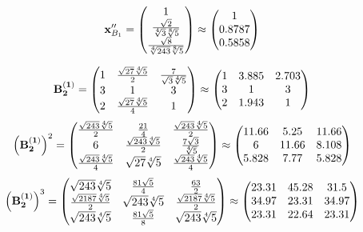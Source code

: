 \documentclass[10pt,a4paper]{article}
\begin{document}
	\[
		\bold{x}''_{B_1} = 
		\begin{pmatrix}
			{1} {} \\
			\frac{\sqrt{2}} {\sqrt[4]{3}\sqrt[8]{5}} \\
			\frac{\sqrt{8}} {\sqrt[4]{243}\sqrt[8]{5}} \\
		\end{pmatrix}
		\approx
		\begin{pmatrix}
			1        \\
			0.8787   \\
			0.5858   \\
		\end{pmatrix}
	\]

	\[
		\bold{B_2^{(1)}} = 
		\begin{pmatrix}
			{1} {} & \frac{\sqrt{27}\sqrt[4]{5}} {{2}} & \frac{{7}} {\sqrt{3}\sqrt[4]{5}} \\
			{{3}} {} & {1} {} & {{3}} {} \\
			{{2}} {} & \frac{\sqrt{27}\sqrt[4]{5}} {{4}} & {1} {} \\
		\end{pmatrix}
		\approx
		\begin{pmatrix}
			1        & 3.885    & 2.703    \\
			3        & 1        & 3        \\
			2        & 1.943    & 1        \\
		\end{pmatrix}
	\]
	\[
		\left(\bold{B_2^{(1)}}\right)^{2} = 
		\begin{pmatrix}
			\frac{\sqrt{243}\sqrt[4]{5}} {{2}} & \frac{{21}} {{4}} & \frac{\sqrt{243}\sqrt[4]{5}} {{2}} \\
			{{6}} {} & \frac{\sqrt{243}\sqrt[4]{5}} {{2}} & \frac{{7}\sqrt{3}} {\sqrt[4]{5}} \\
			\frac{\sqrt{243}\sqrt[4]{5}} {{4}} & {\sqrt{27}\sqrt[4]{5}} {} & \frac{\sqrt{243}\sqrt[4]{5}} {{4}} \\
		\end{pmatrix}
		\approx
		\begin{pmatrix}
			11.66    & 5.25     & 11.66    \\
			6        & 11.66    & 8.108    \\
			5.828    & 7.77     & 5.828    \\
		\end{pmatrix}
	\]
	\[
		\left(\bold{B_2^{(1)}}\right)^{3} = 
		\begin{pmatrix}
			{\sqrt{243}\sqrt[4]{5}} {} & \frac{{81}\sqrt{5}} {{4}} & \frac{{63}} {{2}} \\
			\frac{\sqrt{2187}\sqrt[4]{5}} {{2}} & {\sqrt{243}\sqrt[4]{5}} {} & \frac{\sqrt{2187}\sqrt[4]{5}} {{2}} \\
			{\sqrt{243}\sqrt[4]{5}} {} & \frac{{81}\sqrt{5}} {{8}} & {\sqrt{243}\sqrt[4]{5}} {} \\
		\end{pmatrix}
		\approx
		\begin{pmatrix}
			23.31    & 45.28    & 31.5     \\
			34.97    & 23.31    & 34.97    \\
			23.31    & 22.64    & 23.31    \\
		\end{pmatrix}
	\]
\end{document}
